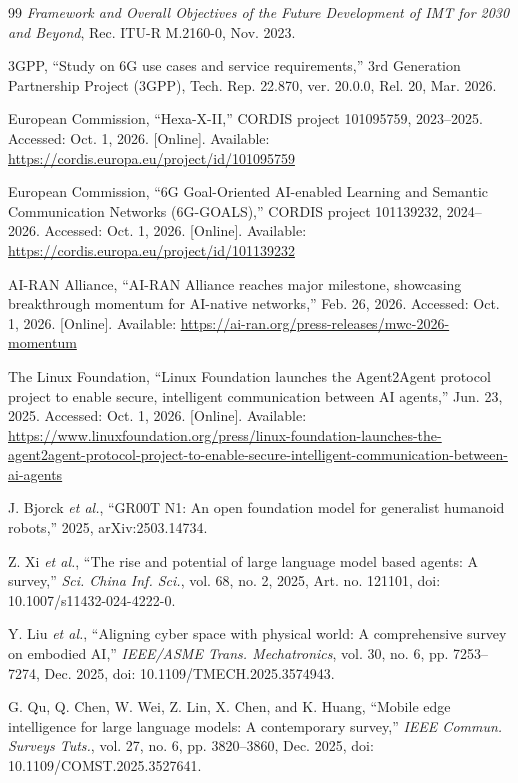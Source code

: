 \documentclass[letterpaper,journal]{IEEEtran}
\newcommand{\etal}{\emph{et al.}}
\begin{document}
\begin{thebibliography}{99}
\emph{Framework and Overall Objectives of the Future Development of IMT
for 2030 and Beyond}, Rec. ITU-R M.2160-0, Nov. 2023.

3GPP, ``Study on 6G use cases and service requirements,'' 3rd Generation
Partnership Project (3GPP), Tech. Rep. 22.870, ver. 20.0.0, Rel. 20,
Mar. 2026.

European Commission, ``Hexa-X-II,'' CORDIS project 101095759, 2023--2025.
Accessed: Oct. 1, 2026. [Online]. Available:
\url{https://cordis.europa.eu/project/id/101095759}

European Commission, ``6G Goal-Oriented AI-enabled Learning and Semantic
Communication Networks (6G-GOALS),'' CORDIS project 101139232, 2024--2026.
Accessed: Oct. 1, 2026. [Online]. Available:
\url{https://cordis.europa.eu/project/id/101139232}

AI-RAN Alliance, ``AI-RAN Alliance reaches major milestone, showcasing
breakthrough momentum for AI-native networks,'' Feb. 26, 2026.
Accessed: Oct. 1, 2026. [Online]. Available:
\url{https://ai-ran.org/press-releases/mwc-2026-momentum}

The Linux Foundation, ``Linux Foundation launches the Agent2Agent protocol
project to enable secure, intelligent communication between AI agents,''
Jun. 23, 2025. Accessed: Oct. 1, 2026. [Online]. Available:
\begingroup\def\UrlBreaks{\do\/\do-}%
\url{https://www.linuxfoundation.org/press/linux-foundation-launches-the-agent2agent-protocol-project-to-enable-secure-intelligent-communication-between-ai-agents}\endgroup

J. Bjorck \etal, ``GR00T N1: An open foundation model for generalist humanoid
robots,'' 2025, arXiv:2503.14734.

Z. Xi \etal, ``The rise and potential of large language model based agents:
A survey,'' \emph{Sci. China Inf. Sci.}, vol. 68, no. 2, 2025,
Art. no. 121101, doi: 10.1007/s11432-024-4222-0.

Y. Liu \etal, ``Aligning cyber space with physical world: A comprehensive
survey on embodied AI,'' \emph{IEEE/ASME Trans. Mechatronics}, vol. 30,
no. 6, pp. 7253--7274, Dec. 2025, doi: 10.1109/TMECH.2025.3574943.

G. Qu, Q. Chen, W. Wei, Z. Lin, X. Chen, and K. Huang, ``Mobile edge
intelligence for large language models: A contemporary survey,'' \emph{IEEE
Commun. Surveys Tuts.}, vol. 27, no. 6, pp. 3820--3860, Dec. 2025,
doi: 10.1109/COMST.2025.3527641.


\end{thebibliography}
\end{document}
